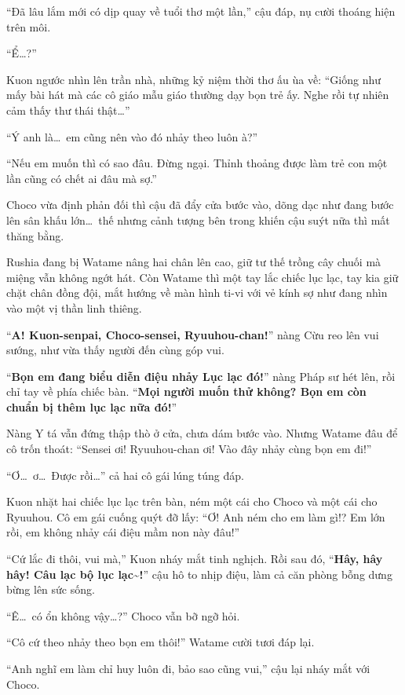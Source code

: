 \documentclass[../main.tex]{subfiles}
\begin{document}
``Đã lâu lắm mới có dịp quay về tuổi thơ một lần,'' cậu đáp, nụ cười thoáng hiện trên môi.

``Ể\dots?''

Kuon ngước nhìn lên trần nhà, những kỷ niệm thời thơ ấu ùa về: ``Giống như mấy bài hát mà các cô giáo mẫu giáo thường dạy bọn trẻ ấy. Nghe rồi tự nhiên cảm thấy thư thái thật\dots''

``Ý anh là\dots\ em cũng nên vào đó nhảy theo luôn à?''

``Nếu em muốn thì có sao đâu. Đừng ngại. Thỉnh thoảng được làm trẻ con một lần cũng có chết ai đâu mà sợ.''

Choco vừa định phản đối thì cậu đã đẩy cửa bước vào, dõng dạc như đang bước lên sân khấu lớn\dots\ thế nhưng cảnh tượng bên trong khiến cậu suýt nữa thì mất thăng bằng.

Rushia đang bị Watame nâng hai chân lên cao, giữ tư thế trồng cây chuối mà miệng vẫn không ngớt hát. Còn Watame thì một tay lắc chiếc lục lạc, tay kia giữ chặt chân đồng đội, mắt hướng về màn hình ti-vi với vẻ kính sợ như đang nhìn vào một vị thần linh thiêng.

``\textbf{A! Kuon-senpai, Choco-sensei, Ryuuhou-chan!}'' nàng Cừu reo lên vui sướng, như vừa thấy người đến cùng góp vui.

``\textbf{Bọn em đang biểu diễn điệu nhảy Lục lạc đó!}'' nàng Pháp sư hét lên, rồi chỉ tay về phía chiếc bàn. ``\textbf{Mọi người muốn thử không? Bọn em còn chuẩn bị thêm lục lạc nữa đó!}''

Nàng Y tá vẫn đứng thập thò ở cửa, chưa dám bước vào. Nhưng Watame đâu để cô trốn thoát: ``Sensei ơi! Ryuuhou-chan ơi! Vào đây nhảy cùng bọn em đi!''

``Ơ\dots\ ơ\dots\ Được rồi\dots'' cả hai cô gái lúng túng đáp.

Kuon nhặt hai chiếc lục lạc trên bàn, ném một cái cho Choco và một cái cho Ryuuhou. Cô em gái cuống quýt đỡ lấy: ``Ơ! Anh ném cho em làm gì!? Em lớn rồi, em không nhảy cái điệu mầm non này đâu!''

``Cứ lắc đi thôi, vui mà,'' Kuon nháy mắt tinh nghịch. Rồi sau đó, ``\textbf{Hây, hây hây! Câu lạc bộ lục lạc\~{}!}'' cậu hô to nhịp điệu, làm cả căn phòng bỗng dưng bừng lên sức sống.

``Ê\dots\ có ổn không vậy\dots?'' Choco vẫn bỡ ngỡ hỏi.

``Cô cứ theo nhảy theo bọn em thôi!'' Watame cười tươi đáp lại.

``Anh nghĩ em làm chỉ huy luôn đi, bảo sao cũng vui,'' cậu lại nháy mắt với Choco.
\end{document}

